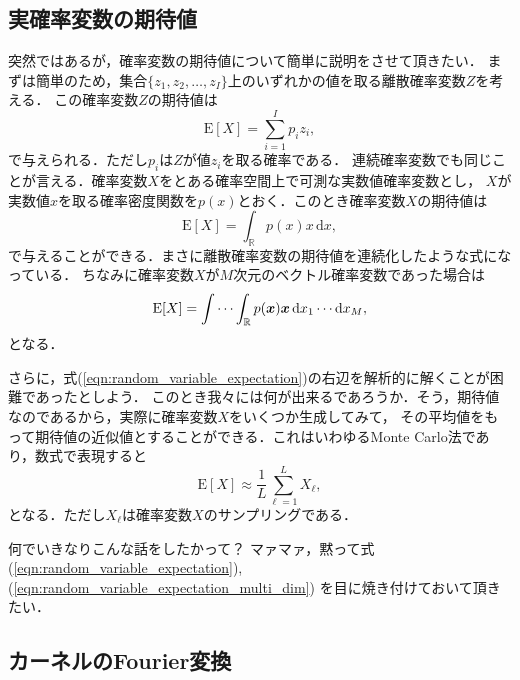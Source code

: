 %

\subsection{実確率変数の期待値}

突然ではあるが，確率変数の期待値について簡単に説明をさせて頂きたい．
まずは簡単のため，集合$\{z_1, z_2, \ldots, z_I \}$上のいずれかの値を取る離散確率変数$Z$を考える．
この確率変数$Z$の期待値は
\begin{equation}
    \mathrm{E}[X] = \sum_{i = 1}^{I} p_i z_i,
\end{equation}
で与えられる．ただし$p_i$は$Z$が値$z_i$を取る確率である．
連続確率変数でも同じことが言える．確率変数$X$をとある確率空間上で可測な実数値確率変数とし，
$X$が実数値$x$を取る確率密度関数を$p(x)$とおく．このとき確率変数$X$の期待値は
\begin{equation}
    \mathrm{E}[X] = \int_{\mathbb{R}} p(x) x \, \mathrm{d}x,
    \label{eqn:random_variable_expectation}
\end{equation}
で与えることができる．まさに離散確率変数の期待値を連続化したような式になっている．
ちなみに確率変数$X$が$M$次元のベクトル確率変数であった場合は
\begin{equation}
    \mathrm{E}[X] = \idotsint_{\mathbb{R}} p(\boldsymbol{x}) \boldsymbol{x}
    \, \mathrm{d}x_1 \cdots \mathrm{d}x_M,
    \label{eqn:random_variable_expectation_multi_dim}
\end{equation}
となる．

さらに，式(\ref{eqn:random_variable_expectation})の右辺を解析的に解くことが困難であったとしよう．
このとき我々には何が出来るであろうか．そう，期待値なのであるから，実際に確率変数$X$をいくつか生成してみて，
その平均値をもって期待値の近似値とすることができる．これはいわゆるMonte Carlo法であり，数式で表現すると
\begin{equation}
    \mathrm{E}[X] \approx \frac{1}{L} \sum_{\ell = 1}^{L} X_{\ell},
\end{equation}
となる．ただし$X_{\ell}$は確率変数$X$のサンプリングである．

何でいきなりこんな話をしたかって？
マァマァ，黙って式(\ref{eqn:random_variable_expectation}), (\ref{eqn:random_variable_expectation_multi_dim})
を目に焼き付けておいて頂きたい．

\subsection{カーネルのFourier変換}

